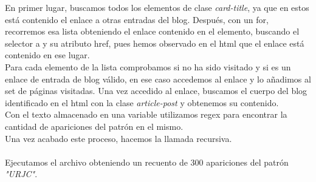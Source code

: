 \documentclass[12pt, a4paper,twoside,titlepage]{article}
\begin{document}
En primer lugar, buscamos todos los elementos de clase \emph{card-title}, ya que en estos está contenido el enlace a otras entradas del blog. Después, con un for, recorremos esa lista obteniendo el enlace contenido en el elemento, buscando el selector a y su atributo href, pues hemos observado en el html que el enlace está contenido en ese lugar.\\

Para cada elemento de la lista comprobamos si no ha sido visitado y si es un enlace de entrada de blog válido, en ese caso accedemos al enlace y lo añadimos al set de páginas visitadas. Una vez accedido al enlace, buscamos el cuerpo del blog identificado en el html con la clase \emph{article-post} y obtenemos su contenido.\\

Con el texto almacenado en una variable utilizamos regex para encontrar la cantidad de apariciones del patrón en el mismo.\\

Una vez acabado este proceso, hacemos la llamada recursiva.\\

\\

Ejecutamos el archivo obteniendo un recuento de 300 apariciones del patrón \emph{"URJC"}.

\clearpage
\end{document}
